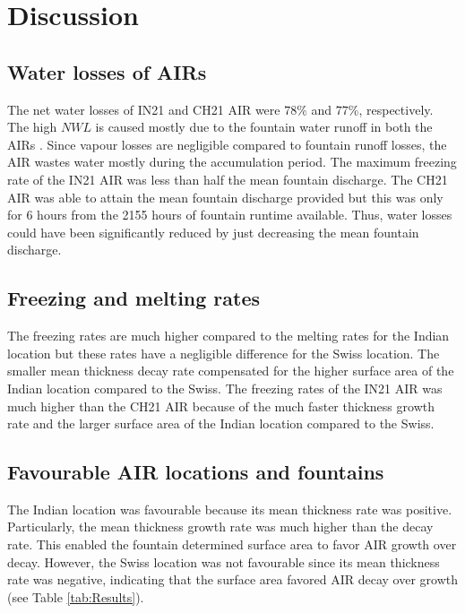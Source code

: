 \documentclass[utf8]{frontiersSCNS}
\begin{document}
\section{Discussion}

\subsection{Water losses of AIRs}

The net water losses of IN21 and CH21 AIR were $78\%$ and $77\%$, respectively. The high $NWL$ is caused mostly
due to the fountain water runoff in both the AIRs . Since vapour losses are negligible compared to fountain
runoff losses, the AIR wastes water mostly during the accumulation period. The maximum freezing rate of the IN21
AIR was less than half the mean fountain discharge. The CH21 AIR was able to attain the mean fountain discharge
provided but this was only for 6 hours from the 2155 hours of fountain runtime available. Thus, water losses
could have been significantly reduced by just decreasing the mean fountain discharge.

\subsection{Freezing and melting rates}

The freezing rates are much higher compared to the melting rates for the Indian location but these rates have a
negligible difference for the Swiss location. The smaller mean thickness decay rate compensated for the higher
surface area of the Indian location compared to the Swiss. The freezing rates of the IN21 AIR was much higher
than the CH21 AIR because of the much faster thickness growth rate and the larger surface area of the Indian
location compared to the Swiss.

\subsection{Favourable AIR locations and fountains}

The Indian location was favourable because its mean thickness rate was positive. Particularly, the mean
thickness growth rate was much higher than the decay rate. This enabled the fountain determined surface area to
favor AIR growth over decay. However, the Swiss location was not favourable since its mean thickness rate was
negative, indicating that the surface area favored AIR decay over growth (see Table \ref{tab:Results}).
\end{document}
